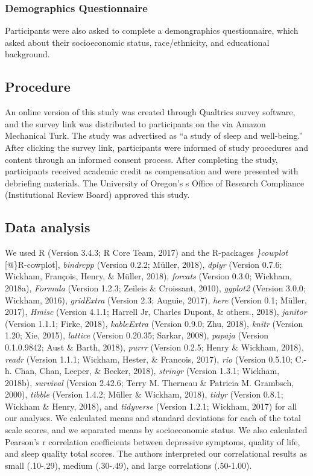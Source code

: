 \documentclass[man, noextraspace]{apa6}
\theoremstyle{definition}
\theoremstyle{definition}
\theoremstyle{definition}
\theoremstyle{remark}
\begin{document}
\subsubsection{Demographics
Questionnaire}\label{demographics-questionnaire}

Participants were also asked to complete a demongraphics questionnaire,
which asked about their socioeconomic status, race/ethnicity, and
educational background.

\subsection{Procedure}\label{procedure}

An online version of this study was created through Qualtrics survey
software, and the survey link was distributed to participants on the via
Amazon Mechanical Turk. The study was advertised as \enquote{a study of
sleep and well-being.} After clicking the survey link, participants were
informed of study procedures and content through an informed consent
process. After completing the study, participants received academic
credit as compensation and were presented with debriefing materials. The
University of Oregon's s Office of Research Compliance (Institutional
Review Board) approved this study.

\subsection{Data analysis}\label{data-analysis}

We used R (Version 3.4.3; R Core Team, 2017) and the R-packages
\emph{\}cowplot} {[}@\}R-cowplot{]}, \emph{bindrcpp} (Version 0.2.2;
Müller, 2018), \emph{dplyr} (Version 0.7.6; Wickham, François, Henry, \&
Müller, 2018), \emph{forcats} (Version 0.3.0; Wickham, 2018a),
\emph{Formula} (Version 1.2.3; Zeileis \& Croissant, 2010),
\emph{ggplot2} (Version 3.0.0; Wickham, 2016), \emph{gridExtra} (Version
2.3; Auguie, 2017), \emph{here} (Version 0.1; Müller, 2017),
\emph{Hmisc} (Version 4.1.1; Harrell Jr, Charles Dupont, \& others.,
2018), \emph{janitor} (Version 1.1.1; Firke, 2018), \emph{kableExtra}
(Version 0.9.0; Zhu, 2018), \emph{knitr} (Version 1.20; Xie, 2015),
\emph{lattice} (Version 0.20.35; Sarkar, 2008), \emph{papaja} (Version
0.1.0.9842; Aust \& Barth, 2018), \emph{purrr} (Version 0.2.5; Henry \&
Wickham, 2018), \emph{readr} (Version 1.1.1; Wickham, Hester, \&
Francois, 2017), \emph{rio} (Version 0.5.10; C.-h. Chan, Chan, Leeper,
\& Becker, 2018), \emph{stringr} (Version 1.3.1; Wickham, 2018b),
\emph{survival} (Version 2.42.6; Terry M. Therneau \& Patricia M.
Grambsch, 2000), \emph{tibble} (Version 1.4.2; Müller \& Wickham, 2018),
\emph{tidyr} (Version 0.8.1; Wickham \& Henry, 2018), and
\emph{tidyverse} (Version 1.2.1; Wickham, 2017) for all our analyses. We
calculated means and standard deviations for each of the total scale
scores, and we separated means by socioeconomic status. We also
calculated Pearson's r correlation coefficients between depressive
symptoms, quality of life, and sleep quality total scores. The authors
interpreted our correlational results as small (.10-.29), medium
(.30-.49), and large correlations (.50-1.00).
\end{document}
